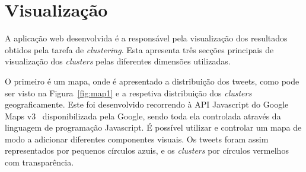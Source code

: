 %

\section{Visualização}

A aplicação web desenvolvida é a responsável pela visualização dos resultados obtidos pela tarefa de \textit{clustering}. Esta apresenta três secções principais de visualização dos \textit{clusters} pelas diferentes dimensões utilizadas. 

O primeiro é um mapa, onde é apresentado a distribuição dos tweets, como pode ser visto na Figura~\ref{fig:map1} e a respetiva distribuição dos \textit{clusters} geograficamente. Este foi desenvolvido recorrendo à API Javascript do Google Maps v3~\cite{googlemapsapi} disponibilizada pela Google, sendo toda ela controlada através da linguagem de programação Javascript. É possível utilizar e controlar um mapa de modo a adicionar diferentes componentes visuais. Os tweets foram assim representados por pequenos círculos azuis, e os \textit{clusters} por círculos vermelhos com transparência. 

